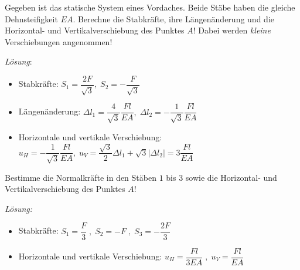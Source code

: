 

\begin{example}
	Gegeben ist das statische System eines Vordaches. Beide Stäbe haben die gleiche Dehnsteifigkeit $EA$.
	Berechne die Stabkräfte, ihre Längenänderung und die Horizontal- und Vertikalverschiebung des Punktes $A$! Dabei werden \emph{kleine} Verschiebungen angenommen!
	\begin{center}
		
	\end{center}
	
	\textit{Lösung}:
	\begin{itemize}
		\item Stabkräfte: $S_1 = \dfrac{2F}{\sqrt{3}}, \; S_2=-\dfrac{F}{\sqrt{3}}$ 
		\item Längenänderung: $\Delta l_1 = \dfrac{4}{\sqrt{3}}\dfrac{Fl}{EA}, \; \Delta l_2 = -\dfrac{1}{\sqrt{3}}\dfrac{Fl}{EA}$ 
		\item Horizontale und vertikale Verschiebung: $u_H = -\dfrac{1}{\sqrt{3}}\dfrac{Fl}{EA},\; u_V = \dfrac{\sqrt{3}}{2}\Delta l_1 + \sqrt{3}|\Delta l_2| = 3\dfrac{Fl}{EA} $
	\end{itemize}
\end{example}


\begin{example}
	Bestimme die Normalkräfte in den Stäben $1$ bis $3$ sowie die Horizontal- und Vertikalverschiebung des Punktes $A$!
	\begin{center}
		
	\end{center}
	
	\textit{Lösung:}
	\begin{itemize}
		\item Stabkräfte: $S_1 = \dfrac{F}{3}\;, \; S_2 = -F\;, \; S_3 =-\dfrac{2F}{3}$ 
		\item Horizontale und vertikale Verschiebung: $u_H=\dfrac{Fl}{3EA}\;, \; u_V=\dfrac{Fl}{EA}$
	\end{itemize}
	 
\end{example}

